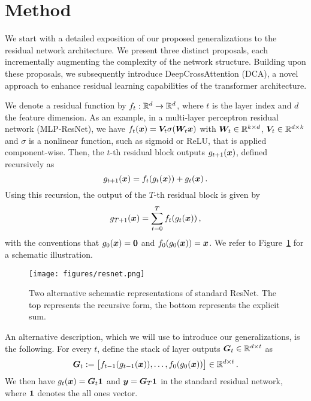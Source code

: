 \section{Method}
\label{sec:method}


We start with a detailed exposition of our proposed generalizations to the residual network architecture. We present three distinct proposals, each incrementally augmenting the complexity of the network structure. Building upon these proposals, we subsequently introduce DeepCrossAttention (DCA), a novel approach to enhance residual learning capabilities of the transformer architecture.

 We denote a residual function by $f_t:\mathbb{R}^d\to\mathbb{R}^d$, where $t$ is the layer index and $d$ the feature dimension. As an example, in a multi-layer perceptron residual network (MLP-ResNet), we have $f_t(\bm{x}) ={\bm{V}}_t \sigma(\bm{W}_t \bm{x})$ with $\bm{W}_t\in \mathbb{R}^{k\times d}$, ${\bm{V}}_t\in\mathbb{R}^{d \times k}$ and $\sigma$ is a nonlinear function, such
as sigmoid or ReLU, that is applied component-wise. Then, the
$t$-th residual block outputs $g_{t+1}(\bm{x})$, defined recursively as
\[
g_{t+1}(\bm{x}) = f_t(g_t(\bm{x}))+ g_t(\bm{x})\,.
\]
Using this recursion, the output of the $T$-th residual block
is given by
\[
g_{T+1}(\bm{x}) = \sum_{t=0}^T f_t(g_t(\bm{x}))\,,
\]
with the conventions that $g_0(\bm{x}) = \boldsymbol{0}$ and $f_0(g_0(\bm{x})) = \bm{x}$.  We refer to Figure~\ref{fig:resnet} for a schematic illustration.

\begin{figure}[t!]
    \centering
    \texttt{[image: figures/resnet.png]}
    \caption{Two alternative schematic representations of standard ResNet. The top represents the recursive form, the bottom represents the explicit sum.}
    \label{fig:resnet}
\end{figure}

An alternative description, which we will use to introduce our generalizations, is the following. For every $t$, define the stack of layer outputs ${\bm{G}}_t\in \mathbb{R}^{d\times t}$ as
\[
{\bm{G}}_t: = \begin{bmatrix}
f_{t-1}(g_{t-1}(\bm{x})), \dotsc, f_0(g_0(\bm{x}))
\end{bmatrix}\in\mathbb{R}^{d\times t}\,.
\]
We then have $g_t(\bm{x}) = {\bm{G}}_t {\mathbf{1}}$ and $\bm{y} = {\bm{G}}_{T}{\mathbf{1}}$ in the standard residual network, where ${\mathbf{1}}$ denotes the all ones vector.


